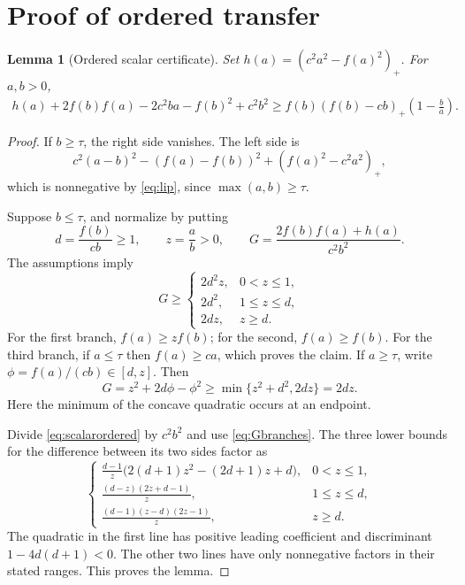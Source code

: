 \documentclass[11pt]{article}
\newtheorem{lemma}[theorem]{Lemma}
\theoremstyle{definition}
\begin{document}
\section{Proof of ordered transfer}
\begin{lemma}[Ordered scalar certificate]\label{lem:orderedscalar}
Set $h(a)=(c^2a^2-f(a)^2)_+$. For $a,b>0$,
\begin{align}\label{eq:scalarordered}
 h(a)+2f(b)f(a)-2c^2ba-f(b)^2+c^2b^2
 \ge f(b)(f(b)-cb)_+\left(1-\frac ba\right).
\end{align}
\end{lemma}
\begin{proof}
If $b\ge\tau$, the right side vanishes. The left side is
\[
 c^2(a-b)^2-(f(a)-f(b))^2+(f(a)^2-c^2a^2)_+,
\]
which is nonnegative by \eqref{eq:lip}, since $\max(a,b)\ge\tau$.

Suppose $b\le\tau$, and normalize by putting
\[
 d=\frac{f(b)}{cb}\ge1,\qquad z=\frac ab>0,\qquad
 G=\frac{2f(b)f(a)+h(a)}{c^2b^2}.
\]
The assumptions imply
\begin{equation}\label{eq:Gbranches}
 G\ge\begin{cases}
 2d^2z,&0<z\le1,\\
 2d^2,&1\le z\le d,\\
 2dz,&z\ge d.
 \end{cases}
\end{equation}
For the first branch, $f(a)\ge zf(b)$; for the second, $f(a)\ge f(b)$. For the third branch, if $a\le\tau$ then $f(a)\ge ca$, which proves the claim. If $a\ge\tau$, write $\phi=f(a)/(cb)\in[d,z]$. Then
\[
 G=z^2+2d\phi-\phi^2\ge\min\{z^2+d^2,2dz\}=2dz.
\]
Here the minimum of the concave quadratic occurs at an endpoint.

Divide \eqref{eq:scalarordered} by $c^2b^2$ and use \eqref{eq:Gbranches}. The three lower bounds for the difference between its two sides factor as
\begin{equation}\label{eq:branchcertificates}
 \begin{cases}
 \displaystyle\frac{d-1}{z}
  \bigl(2(d+1)z^2-(2d+1)z+d\bigr),&0<z\le1,\\[5pt]
 \displaystyle\frac{(d-z)(2z+d-1)}{z},&1\le z\le d,\\[5pt]
 \displaystyle\frac{(d-1)(z-d)(2z-1)}{z},&z\ge d.
 \end{cases}
\end{equation}
The quadratic in the first line has positive leading coefficient and discriminant $1-4d(d+1)<0$. The other two lines have only nonnegative factors in their stated ranges. This proves the lemma.
\end{proof}
\end{document}
